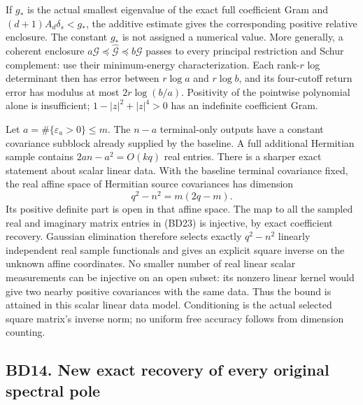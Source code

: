 \documentclass[11pt]{article}
\begin{document}
If \(g_*\) is the actual smallest eigenvalue of the exact full coefficient Gram and \((d+1)A_d\delta_s<g_*\), the additive estimate gives the corresponding positive relative enclosure. The constant \(g_*\) is not assigned a numerical value. More generally, a coherent enclosure \(a\mathcal G\preceq\widehat{\mathcal G}\preceq b\mathcal G\) passes to every principal restriction and Schur complement: use their minimum-energy characterization. Each rank-\(r\) log determinant then has error between \(r\log a\) and \(r\log b\), and its four-cutoff return error has modulus at most \(2r\log(b/a)\). Positivity of the pointwise polynomial alone is insufficient; \(1-|z|^2+|z|^4>0\) has an indefinite coefficient Gram.

Let \(a=\#\{\varepsilon_a>0\}\le m\). The \(n-a\) terminal-only outputs have a constant covariance subblock already supplied by the baseline. A full additional Hermitian sample contains \(2an-a^2=O(kq)\) real entries. There is a sharper exact statement about scalar linear data. With the baseline terminal covariance fixed, the real affine space of Hermitian source covariances has dimension \[
q^2-n^2=m(2q-m). \tag{BD24}
\] Its positive definite part is open in that affine space. The map to all the sampled real and imaginary matrix entries in (BD23) is injective, by exact coefficient recovery. Gaussian elimination therefore selects exactly \(q^2-n^2\) linearly independent real sample functionals and gives an explicit square inverse on the unknown affine coordinates. No smaller number of real linear scalar measurements can be injective on an open subset: its nonzero linear kernel would give two nearby positive covariances with the same data. Thus the bound is attained in this scalar linear data model. Conditioning is the actual selected square matrix's inverse norm; no uniform free accuracy follows from dimension counting.

\subsection{BD14. New exact recovery of every original spectral pole}\label{bd14.-new-exact-recovery-of-every-original-spectral-pole}
\end{document}
